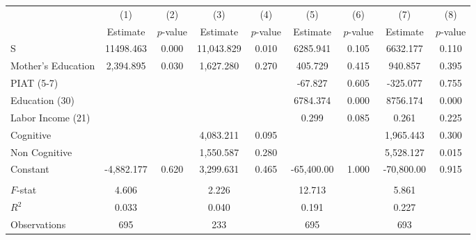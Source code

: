 \begin{tabular}{lcccccccc} \toprule
 & (1) & (2) & (3) & (4) & (5) & (6) & (7) & (8) \\ 
 & Estimate  & $p$-value  & Estimate  & $p$-value  & Estimate  & $p$-value  & Estimate  & $p$-value  \\  \midrule
S & 11498.463 &     0.000 & 11,043.829 &     0.010 &  6285.941 &     0.105 &  6632.177 &     0.110 \\  
Mother's Education &  2,394.895 &     0.030 &  1,627.280 &     0.270 &   405.729 &     0.415 &   940.857 &     0.395 \\  
PIAT (5-7) &         &         &         &         &   -67.827 &     0.605 &  -325.077 &     0.755 \\  
Education (30) &         &         &         &         &  6784.374 &     0.000 &  8756.174 &     0.000 \\  
Labor Income (21) &         &         &         &         &     0.299 &     0.085 &     0.261 &     0.225 \\  
Cognitive &         &         &  4,083.211 &     0.095 &         &         &  1,965.443 &     0.300 \\  
Non Cognitive &         &         &  1,550.587 &     0.280 &         &         &  5,528.127 &     0.015 \\  
Constant & -4,882.177 &     0.620 &  3,299.631 &     0.465 & -65,400.00 &     1.000 & -70,800.00 &     0.915 \\ \\ \midrule  
$F$-stat &     4.606 &         &     2.226 &         &    12.713 &         &     5.861 &        \\ 
$R^2$ &     0.033 &         &     0.040 &         &     0.191 &         &     0.227 &        \\ 
Observations &   695 &         &   233 &         &   695  &         &   693  &        \\ 
\bottomrule \end{tabular}
